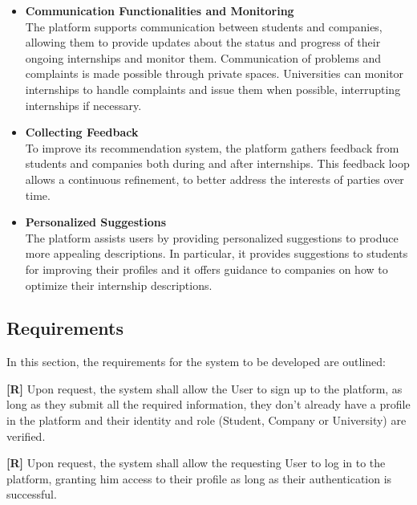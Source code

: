 \begin{itemize}
    \item \textbf{Communication Functionalities and Monitoring} \\
    The platform supports communication between students and companies, allowing them to provide updates about the status and progress of their ongoing internships and monitor them. 
    Communication of problems and complaints is made possible through private spaces.
    Universities can monitor internships to handle complaints and issue them when possible, interrupting internships if necessary.

    \item \textbf{Collecting Feedback} \\
    To improve its recommendation system, the platform gathers feedback from students and companies both during and after internships. This feedback loop allows a continuous refinement, to better address the interests of parties over time.

    \item \textbf{Personalized Suggestions} \\
    The platform assists users by providing personalized suggestions to produce more appealing descriptions. In particular, it provides suggestions to students for improving their profiles and
    it offers guidance to companies on how to optimize their internship descriptions.
\end{itemize}

\subsection{Requirements}
\label{subsec:requirements}

\setcounter{req}{1}
\newcommand{\creq}{\thereq\stepcounter{req}}

In this section, the requirements for the system to be developed are outlined:

        
        \textbf{[R\creq]} Upon request, the system shall allow the User to sign up to the platform, as long as they submit all the required information, they don't already have a profile in the platform and their identity and role (Student, Company or University) are verified.

        \textbf{[R\creq]} Upon request, the system shall allow the requesting User to log in to the platform, granting him access to their profile as long as their authentication is successful.

